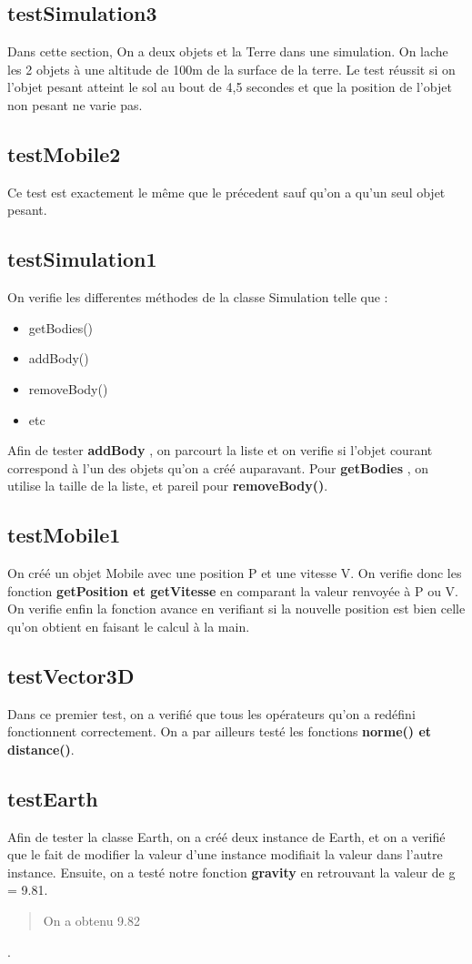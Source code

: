 \documentclass{article}
\begin{document}
\subsection{testSimulation3}
Dans cette section, On a deux objets et la Terre dans une simulation. On lache
les 2 objets à une altitude de 100m de la surface de la terre. Le test réussit
si on l'objet pesant atteint le sol au bout de 4,5 secondes et que la position
de l'objet non pesant ne varie pas.
\subsection{testMobile2}
Ce test est exactement le même que le précedent sauf qu'on a qu'un seul objet pesant.
\subsection{testSimulation1}
On verifie les differentes méthodes de la classe Simulation telle que : 
\begin{itemize}
  \item getBodies()
  \item addBody()
  \item removeBody()
  \item etc
\end{itemize}
Afin de tester \textbf{addBody} , on parcourt la liste et on verifie si l'objet
courant correspond à l'un des objets qu'on a créé auparavant. Pour
\textbf{getBodies} , on utilise la taille de la liste, et pareil pour
\textbf{removeBody()}.

\subsection{testMobile1}
On créé un objet Mobile avec une position P et une vitesse V. On verifie donc
les fonction \textbf{getPosition et getVitesse} en comparant la valeur renvoyée
à P ou V. On verifie enfin la fonction avance en verifiant si la nouvelle
position est bien celle qu'on obtient en faisant le calcul à la main.
\subsection{testVector3D}
Dans ce premier test, on a verifié que tous les opérateurs qu'on a redéfini
fonctionnent correctement. On a par ailleurs testé les fonctions
\textbf{norme() et distance()}.

\subsection{testEarth}
Afin de tester la classe Earth, on a créé deux instance de Earth, et on a
verifié que le fait de modifier la valeur d'une instance modifiait la valeur
dans l'autre instance. Ensuite, on a testé notre fonction \textbf{gravity} en
retrouvant la valeur de g = 9.81. \begin{quote} On a obtenu 9.82 \end{quote}. 
\end{document}
